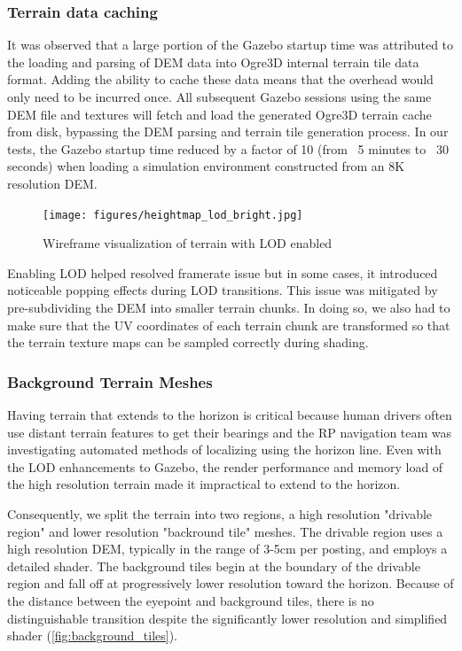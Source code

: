 \documentclass[twocolumn,letterpaper]{IEEEAerospaceCLS}  %
\begin{document}
\subsubsection{Terrain data caching}

It was observed that a large portion of the Gazebo startup time was attributed to the loading and parsing of DEM data into Ogre3D internal terrain tile data format. 
Adding the ability to cache these data means that the overhead would only need to be incurred once. 
All subsequent Gazebo sessions using the same DEM file and textures will fetch and load the generated Ogre3D terrain cache from disk, bypassing the DEM parsing and terrain tile generation process. 
In our tests, the Gazebo startup time reduced by a factor of 10 (from ~5 minutes to ~30 seconds) when loading a simulation environment constructed from an 8K resolution DEM.

\begin{figure}[h!]
	\texttt{[image: figures/heightmap\_lod\_bright.jpg]}
   	\caption{Wireframe visualization of terrain with LOD enabled}
    \label{fig:heightmaplod}
\end{figure}

Enabling LOD helped resolved framerate issue but in some cases, it introduced noticeable popping effects during LOD transitions. 
This issue was mitigated by pre-subdividing the DEM into smaller terrain chunks. 
In doing so, we also had to make sure that the UV coordinates of each terrain chunk are transformed so that the terrain texture maps can be sampled correctly during shading.

\subsubsection{Background Terrain Meshes}

Having terrain that extends to the horizon is critical because human drivers often use distant terrain features to get their bearings and the RP navigation team was investigating automated methods of localizing using the horizon line. Even with the LOD enhancements to Gazebo, the render performance and memory load of the high resolution terrain made it impractical to extend to the horizon. 

Consequently, we split the terrain into two regions, a high resolution "drivable region" and lower resolution "backround tile" meshes. 
The drivable region uses a high resolution DEM, typically in the range of 3-5cm per posting, and employs a detailed shader. 
The background tiles begin at the boundary of the drivable region and fall off at progressively lower resolution toward the horizon. 
Because of the distance between the eyepoint and background tiles, there is no distinguishable transition despite the significantly lower resolution and simplified shader (\cref{fig:background_tiles}). 
\end{document}
